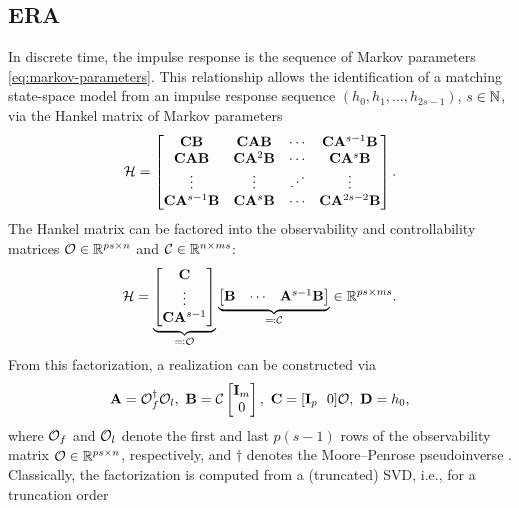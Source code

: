 \documentclass[non-peer-review]{fa2026}
\begin{document}
\subsection{ERA}
\label{sec:era}
%
In discrete time, the impulse response is the sequence of Markov parameters \cref{eq:markov-parameters}. This
relationship allows the identification of a matching state-space model from an impulse response sequence
\((h_0,h_1,\dots,h_{2s-1})\), \(s\in\N\), via the Hankel matrix of Markov parameters
%
\begin{equation}
  \label{eq:H}
  \mathcal{H}=
  \begin{bmatrix}
    \mathbf{C}\mathbf{B} & \mathbf{C}\mathbf{A}\mathbf{B} & \cdots & \mathbf{C}\mathbf{A}^{s-1}\mathbf{B}\\
    \mathbf{C}\mathbf{A}\mathbf{B} & \mathbf{C}\mathbf{A}^2\mathbf{B} &\cdots & \mathbf{C}\mathbf{A}^s\mathbf{B} \\
    \vdots & \vdots & \iddots &\vdots\\
    \mathbf{C}\mathbf{A}^{s-1}\mathbf{B} & \mathbf{C}\mathbf{A}^{s}\mathbf{B} & \cdots & \mathbf{C}\mathbf{A}^{2s-2}\mathbf{B}
  \end{bmatrix}.
\end{equation}
%
The Hankel matrix can be factored into the observability and controllability matrices \(\oMat\in\R[ps][n]\) and
\(\cMat\in\R[n][ms]\):
%
\begin{align*}
  \H=
  \underbrace{\begin{bmatrix}
    \matC\\
    \vdots\\
    \matC\matA^{s-1}
  \end{bmatrix}}_{\eqqcolon \oMat}
  \underbrace{
  \begin{bmatrix}
    \matB&\cdots&\matA^{s-1}\matB
  \end{bmatrix}}_{\eqqcolon \cMat}\in\R[ps][ms].
\end{align*}
%
From this factorization, a realization can be constructed via
%
\begin{equation}
  \label{eq:realization}
  \mathbf{A}=\mathcal{O}_{f}^{\dagger}\mathcal{O}_{l},~\mathbf{B}=\mathcal{C}
  \begin{bmatrix}
    \mathbf{I}_{m}\\0
  \end{bmatrix},~\mathbf{C}=[\mathbf{I}_p~~0]\mathcal{O},~\mathbf{D}=h_0,
\end{equation}
%
where \(\mathcal{O}_{f}\) and \(\mathcal{O}_{l}\) denote the first and last \(p(s-1)\) rows of the observability matrix
\(\oMat\in\R[ps][n]\), respectively, and \(\dagger\) denotes the Moore--Penrose pseudoinverse \cite{kung1978,juang1985}.
Classically, the factorization is computed from a (truncated) \acs{SVD}, i.e., for a truncation order
\end{document}
